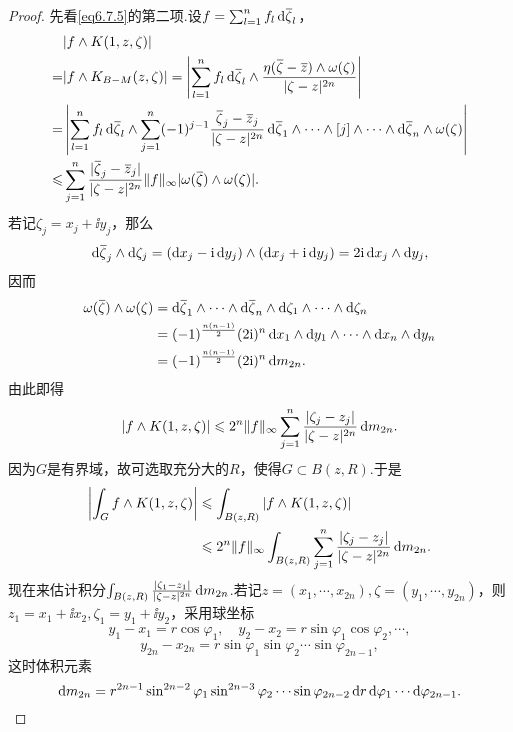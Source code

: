\begin{proof}
	先看\eqref{eq6.7.5}的第二项.设$f=\sum_{l=1}^{n}f_l\mathop{}\!\mathrm{d}{}\mkern1mu\overline{\mkern-1mu\zeta}_l$，
	\begin{align*}
		&|f\wedge K(1,z,\zeta)|\\
		=&|f\wedge K_{B-M}(z,\zeta)|=\left|\sum_{l=1}^{n}f_l\mathop{}\!\mathrm{d}{}\mkern1mu\overline{\mkern-1mu\zeta}_l\wedge\frac{\eta({}\mkern1mu\overline{\mkern-1mu\zeta}-{}\mkern1mu\overline{\mkern-1muz})\wedge\omega(\zeta)}{|\zeta-z|^{2n}}\right|\\
		=&\left|\sum_{l=1}^{n}f_l\mathop{}\!\mathrm{d}{}\mkern1mu\overline{\mkern-1mu\zeta}_l\wedge\sum_{j=1}^{n}(-1)^{j-1}\frac{{}\mkern1mu\overline{\mkern-1mu\zeta}_j-{}\mkern1mu\overline{\mkern-1muz}_j}{|\zeta-z|^{2n}}\mathop{}\!\mathrm{d}{}\mkern1mu\overline{\mkern-1mu\zeta}_1\wedge\cdots\wedge[j]\wedge\cdots\wedge\mathop{}\!\mathrm{d}{}\mkern1mu\overline{\mkern-1mu\zeta}_n\wedge\omega(\zeta)\right|\\
		\leqslant&\sum_{j=1}^{n}\frac{|{}\mkern1mu\overline{\mkern-1mu\zeta}_j-{}\mkern1mu\overline{\mkern-1muz}_j|}{|\zeta-z|^{2n}}\Vert f\Vert_\infty|\omega({}\mkern1mu\overline{\mkern-1mu\zeta})\wedge\omega(\zeta)|.
	\end{align*}
	若记$\zeta_j=x_j+\ii y_j$，那么
	\[\dif\bar{\zeta}_j\wedge\dif\zeta_j=(\dx_j-\ii\dy_j)\wedge(\dx_j+\ii\dy_j)=2\ii \dx_j\wedge\dy_j,\]
	因而
	\begin{align*}
		\omega(\bar{\zeta})\wedge\omega(\zeta)
		&=\dif\bar{\zeta}_1\wedge\cdots\wedge\dif\bar{\zeta}_n\wedge\dif\zeta_1\wedge\cdots\wedge\dif\zeta_n\\
		&=(-1)^{\frac{n(n-1)}{2}}(2\ii)^n \dx_1\wedge\dy_1\wedge\cdots\wedge\dx_n\wedge\dy_n\\
		&=(-1)^{\frac{n(n-1)}{2}}(2\ii)^n\dif m_{2n}.
	\end{align*}
	由此即得
	\[|f\wedge K(1,z,\zeta)|\leqslant 2^n \Vert f\Vert_\infty\sum_{j=1}^{n}\frac{|\zeta_j-z_j|}{|\zeta-z|^{2n}}\mathop{}\!\mathrm{d} m_{2n}.\]
	因为$G$是有界域，故可选取充分大的$R$，使得$G\subset B(z,R)$.于是
	\begin{align}\label{eq6.7.9}
		\left|\int_G f\wedge K(1,z,\zeta)\right|
		&\leqslant \int_{B(z,R)}|f\wedge K(1,z,\zeta)|\notag\\
		&\leqslant 2^n\Vert f\Vert_\infty \int_{B(z,R)}\sum_{j=1}^{n}\frac{|\zeta_j-z_j|}{|\zeta-z|^{2n}}\mathop{}\!\mathrm{d} m_{2n}.
	\end{align}
	现在来估计积分$\int_{B(z,R)}\frac{|\zeta_1-z_1|}{|\zeta-z|^{2n}}\mathop{}\!\mathrm{d} m_{2n}$.若记$z=(x_1,\cdots,x_{2n}),\zeta=(y_1,\cdots,y_{2n})$，则$z_1=x_1+\ii x_2,\zeta_1=y_1+\ii y_2$，采用球坐标
	\[y_1-x_1=r\cos\varphi_1,\quad y_2-x_2=r\sin\varphi_1\cos\varphi_2,\cdots,\]
	\[y_{2n}-x_{2n}=r\sin\varphi_1\sin\varphi_2\cdots\sin\varphi_{2n-1},\]
	这时体积元素
	\[\mathop{}\!\mathrm{d} m_{2n}=r^{2n-1}\sin^{2n-2}\varphi_1\sin^{2n-3}\varphi_2\cdots\sin\varphi_{2n-2}\mathop{}\!\mathrm{d} r\mathop{}\!\mathrm{d}\varphi_1\cdots\mathop{}\!\mathrm{d}\varphi_{2n-1}.\]

\end{proof}

